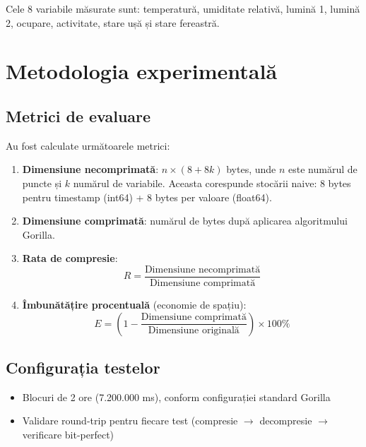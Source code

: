 Cele 8 variabile măsurate sunt: temperatură, umiditate relativă, lumină 1, lumină 2, ocupare, activitate, stare ușă și stare fereastră.

\section{Metodologia experimentală}

\subsection{Metrici de evaluare}

Au fost calculate următoarele metrici:

\begin{enumerate}
    \item \textbf{Dimensiune necomprimată}: $n \times (8 + 8k)$ bytes, unde $n$ este numărul de puncte și $k$ numărul de variabile. Aceasta corespunde stocării naive: 8 bytes pentru timestamp (int64) + 8 bytes per valoare (float64).

    \item \textbf{Dimensiune comprimată}: numărul de bytes după aplicarea algoritmului Gorilla.

    \item \textbf{Rata de compresie}:
    \begin{equation}
        R = \frac{\text{Dimensiune necomprimată}}{\text{Dimensiune comprimată}}
    \end{equation}

    \item \textbf{Îmbunătățire procentuală} (economie de spațiu):
    \begin{equation}
        E = \left(1 - \frac{\text{Dimensiune comprimată}}{\text{Dimensiune originală}}\right) \times 100\%
    \end{equation}
\end{enumerate}

\subsection{Configurația testelor}

\begin{itemize}
    \item Blocuri de 2 ore (7.200.000 ms), conform configurației standard Gorilla
    \item Validare round-trip pentru fiecare test (compresie $\rightarrow$ decompresie $\rightarrow$ verificare bit-perfect)
\end{itemize}

